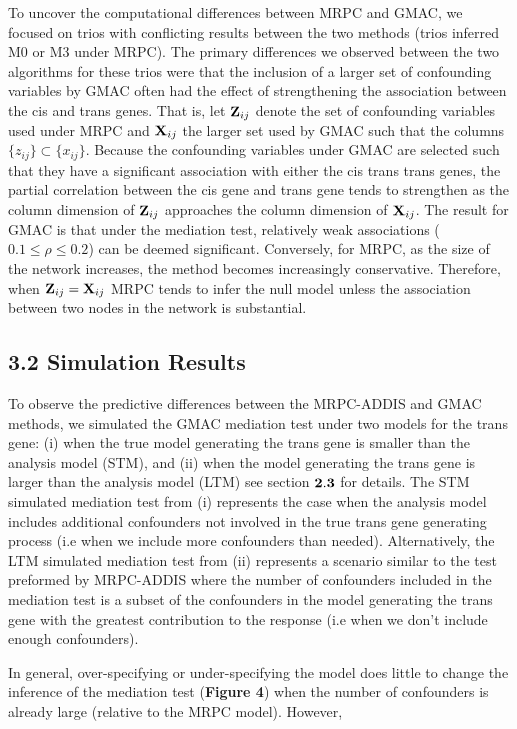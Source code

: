 \documentclass[
]{article}
\begin{document}
To uncover the computational differences between MRPC and GMAC, we
focused on trios with conflicting results between the two methods (trios
inferred M0 or M3 under MRPC). The primary differences we observed
between the two algorithms for these trios were that the inclusion of a
larger set of confounding variables by GMAC often had the effect of
strengthening the association between the cis and trans genes. That is,
let \({\bf Z}_{ij}\) denote the set of confounding variables used under
MRPC and \({\bf X}_{ij}\) the larger set used by GMAC such that the
columns \(\{z_{ij} \} \subset \{x_{ij}\}\). Because the confounding
variables under GMAC are selected such that they have a significant
association with either the cis trans trans genes, the partial
correlation between the cis gene and trans gene tends to strengthen as
the column dimension of \({\bf Z}_{ij}\) approaches the column dimension
of \({\bf X}_{ij}\). The result for GMAC is that under the mediation
test, relatively weak associations (\(0.1 \leq \rho \leq 0.2\)) can be
deemed significant. Conversely, for MRPC, as the size of the network
increases, the method becomes increasingly conservative. Therefore, when
\({\bf Z}_{ij} = {\bf X}_{ij}\) MRPC tends to infer the null model
unless the association between two nodes in the network is substantial.

\subsection*{3.2 Simulation Results}

To observe the predictive differences between the MRPC-ADDIS and GMAC
methods, we simulated the GMAC mediation test under two models for the
trans gene: (i) when the true model generating the trans gene is smaller
than the analysis model (STM), and (ii) when the model generating the
trans gene is larger than the analysis model (LTM) see section
\({\bf 2.3}\) for details. The STM simulated mediation test from (i)
represents the case when the analysis model includes additional
confounders not involved in the true trans gene generating process (i.e
when we include more confounders than needed). Alternatively, the LTM
simulated mediation test from (ii) represents a scenario similar to the
test preformed by MRPC-ADDIS where the number of confounders included in
the mediation test is a subset of the confounders in the model
generating the trans gene with the greatest contribution to the response
(i.e when we don't include enough confounders).

In general, over-specifying or under-specifying the model does little to
change the inference of the mediation test (\textbf{Figure 4}) when the
number of confounders is already large (relative to the MRPC model).
However,
\end{document}
